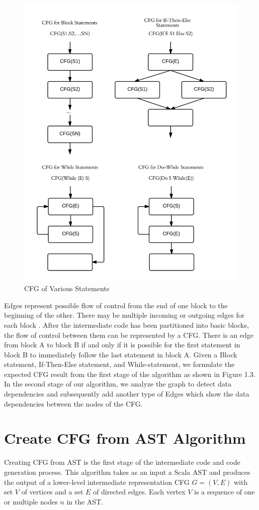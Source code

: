 \begin{figure}[h!]
\centering
\includegraphics[width=0.7\linewidth]{Graph}
\caption{CFG of Various Statements}
\label{fig:Graph}
\end{figure}

Edges represent possible flow of control from the end of one block to the beginning of the other. There may be multiple incoming or outgoing edges for each block \cite{allen1970control}. After the intermediate code has been partitioned into basic blocks, the flow of control between them can be represented by a CFG. There is an edge from block A to block B if and only if it is possible for the first statement in block B to immediately follow the last statement in block A. Given a Block statement, If-Then-Else statement, and While-statement, we formulate the expected CFG result from the first stage of the algorithm as shown in Figure 1.3. In the second stage of our algorithm, we analyze the graph to detect data dependencies and subsequently add another type of Edges which show the data dependencies between the nodes of the CFG. 

\section{Create CFG from AST Algorithm}
Creating CFG from AST is the first stage of the intermediate code and code generation process. This algorithm takes as an input a Scala AST and produces the output of a lower-level intermediate representation CFG $G=(V,E)$ with set $V$ of vertices and a set $E$ of directed edges. Each vertex $V$ is a sequence of one or multiple nodes $n$ in the AST. 

